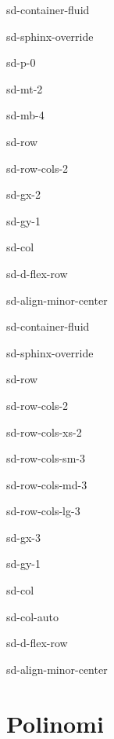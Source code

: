\documentclass[letterpaper,10pt,italian]{jupyterBook}
\begin{document}
\begin{sphinxuseclass}{sd-container-fluid}
\begin{sphinxuseclass}{sd-sphinx-override}
\begin{sphinxuseclass}{sd-p-0}
\begin{sphinxuseclass}{sd-mt-2}
\begin{sphinxuseclass}{sd-mb-4}
\begin{sphinxuseclass}{sd-row}
\begin{sphinxuseclass}{sd-row-cols-2}
\begin{sphinxuseclass}{sd-gx-2}
\begin{sphinxuseclass}{sd-gy-1}
\begin{sphinxuseclass}{sd-col}
\begin{sphinxuseclass}{sd-d-flex-row}
\begin{sphinxuseclass}{sd-align-minor-center}
\begin{sphinxuseclass}{sd-container-fluid}
\begin{sphinxuseclass}{sd-sphinx-override}
\begin{sphinxuseclass}{sd-row}
\begin{sphinxuseclass}{sd-row-cols-2}
\begin{sphinxuseclass}{sd-row-cols-xs-2}
\begin{sphinxuseclass}{sd-row-cols-sm-3}
\begin{sphinxuseclass}{sd-row-cols-md-3}
\begin{sphinxuseclass}{sd-row-cols-lg-3}
\begin{sphinxuseclass}{sd-gx-3}
\begin{sphinxuseclass}{sd-gy-1}
\begin{sphinxuseclass}{sd-col}
\begin{sphinxuseclass}{sd-col-auto}
\begin{sphinxuseclass}{sd-d-flex-row}
\begin{sphinxuseclass}{sd-align-minor-center}
\end{sphinxuseclass}
\end{sphinxuseclass}
\end{sphinxuseclass}
\end{sphinxuseclass}
\end{sphinxuseclass}
\end{sphinxuseclass}
\end{sphinxuseclass}
\end{sphinxuseclass}
\end{sphinxuseclass}
\end{sphinxuseclass}
\end{sphinxuseclass}
\end{sphinxuseclass}
\end{sphinxuseclass}
\end{sphinxuseclass}
\end{sphinxuseclass}
\end{sphinxuseclass}
\end{sphinxuseclass}
\end{sphinxuseclass}
\end{sphinxuseclass}
\end{sphinxuseclass}
\end{sphinxuseclass}
\end{sphinxuseclass}
\end{sphinxuseclass}
\end{sphinxuseclass}
\end{sphinxuseclass}
\end{sphinxuseclass}

\chapter{Polinomi}
\label{\detokenize{ch/precalculus/polynomials:polinomi}}\label{\detokenize{ch/precalculus/polynomials:math-hs-precalculus-polynomials}}\label{\detokenize{ch/precalculus/polynomials::doc}}
\end{document}
